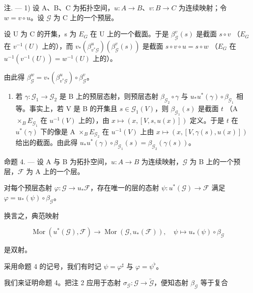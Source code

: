 注. --- 1) 设 A、B、C 为拓扑空间，\(u\colon A \to B\)、\(v\colon B \to C\) 为连续映射；令 \(w = v \circ u\)。设 \(\mathcal{G}\) 为 C 上的一个预层。

设 U 为 C 的开集，s 为 \(E_{G}\) 在 U 上的一个截面。于是 \(\beta_{\mathcal{G}}^{v}(s)\) 是截面 \(s \circ v\) （\(E_{G}\) 在 \(v^{-1}(U)\) 上的），而 \(v_{*}(\beta_{v^{*}\mathcal{G}}^{u})(\beta_{\mathcal{G}}^{v}(s))\) 是截面 \(s \circ v \circ u = s \circ w\) （\(E_{G}\) 在 \(u^{-1}(v^{-1}(U)) = w^{-1}(U)\) 上的）。

由此得 \(\beta_{\mathcal{G}}^{w} = v_{*}(\beta_{v^{*}\mathcal{G}}^{u})\circ \beta_{\mathcal{G}}^{v}\)。

\begin{enumerate}
\def\labelenumi{\arabic{enumi})}
\setcounter{enumi}{1}
\tightlist
\item
  若 \(\gamma\colon\mathcal{G}_{1}\to\mathcal{G}_{2}\) 是 B 上的预层态射，则预层态射 \(\beta_{\mathcal{G}_{2}}\circ\gamma\) 与 \(u_{*}u^{*}(\gamma)\circ\beta_{\mathcal{G}_{1}}\) 相等。事实上，若 V 是 B 的开集且 \(s\in\mathcal{G}_{1}(V)\)，则 \(\beta_{\mathcal{G}_{1}}(s)\) 是截面 \(t\) （A \(\times_{B}E_{\mathcal{G}_{1}}\) 在 \(u^{-1}(V)\) 上的），由 \(x\mapsto(x,[V,s,u(x)])\) 定义。于是 \(t\) 在 \(u^{*}(\gamma)\) 下的像是 A \(\times_{B}E_{\mathcal{G}_{2}}\) 在 \(u^{-1}(V)\) 上由 \(x\mapsto(x,[V,\gamma(s),u(x)])\) 给出的截面。由此得 \(u_{*}u^{*}(\gamma)\circ\beta_{\mathcal{G}_{1}}(s)=\beta_{\mathcal{G}_{2}}(\gamma(s))\)。
\end{enumerate}

命题 4. --- 设 A 与 B 为拓扑空间，\(u\colon A\to B\) 为连续映射，\(\mathcal{G}\) 为 B 上的一个预层，\(\mathcal{F}\) 为 A 上的一个层。

对每个预层态射 \(\varphi\colon\mathcal{G}\to u_{*}\mathcal{F}\)，存在唯一的层的态射 \(\psi\colon u^{*}(\mathcal{G})\to\mathcal{F}\) 满足 \(\varphi=u_{*}(\psi)\circ\beta_{\mathcal{G}}\)。

换言之，典范映射

\[
\operatorname{Mor} \left(u ^ {*} (\mathcal {G}), \mathcal {F}\right)\rightarrow \operatorname{Mor} \left(\mathcal {G}, u _ {*} (\mathcal {F})\right), \quad \psi \mapsto u _ {*} (\psi) \circ \beta_ {\mathcal {G}}
\]

是双射。

采用命题 4 的记号，我们有时记 \(\psi = \varphi^{\sharp}\) 与 \(\varphi = \psi^{\flat}\)。

我们来证明命题 4。把注 2 应用于态射 \(\sigma_{\mathcal{G}}: \mathcal{G} \to \widetilde{\mathcal{G}}\)，便知态射 \(\beta_{\mathcal{G}}\) 等于复合

